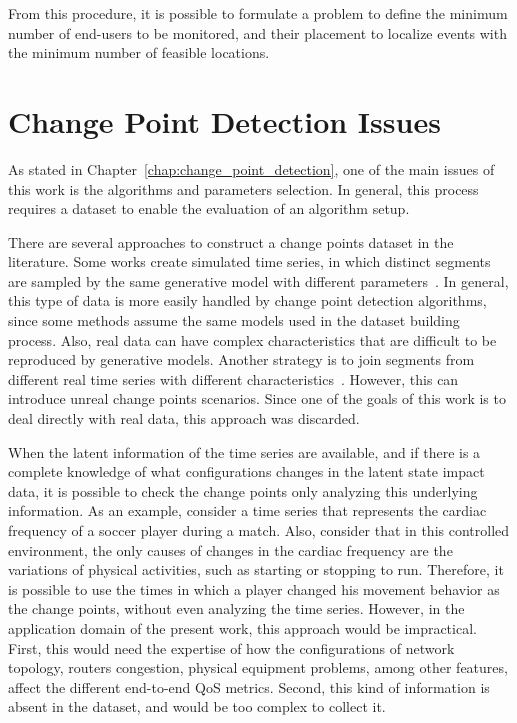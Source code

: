 From this procedure, it is possible to formulate a
problem to define the minimum number of end-users to be monitored, and their
placement to localize events with the minimum number of feasible locations.

\section{Change Point Detection Issues}

As stated in Chapter~\ref{chap:change_point_detection}, one of the main issues
of this work is the algorithms and parameters selection.
In general, this process requires a dataset to enable the evaluation of an
algorithm setup.

There are several approaches to construct a
change points dataset in the literature.
Some works create simulated time series, in which distinct segments are sampled
by the same generative model with different
parameters~\cite{change_point_detection_in_time_series_data_by_relative_density_ratio_estimation}.
In general, this type of data is more easily handled by change point detection
algorithms, since some methods assume the same models used in the dataset
building process. Also, real data can have complex characteristics that are
difficult to be reproduced by generative models. Another strategy is to join
segments from different real time series with different
characteristics~\cite{inertial_hidden_markov_models_modeling_change_in_multivariate_time_series}.
However, this can introduce unreal change points scenarios. Since one of
the goals of this work is to deal directly with real data,
this approach was discarded.

When the latent information of the time series are available, and if there is a
complete knowledge of what configurations changes in the latent state impact
data, it is possible to check the change points only analyzing this underlying
information. As an example, consider a time series that represents the cardiac
frequency of a soccer player during a match. Also, consider that in this
controlled environment, the only causes of changes in the cardiac frequency are
the variations of physical activities, such as starting or stopping to run.
Therefore,
it is possible to use the times in which a player changed his movement behavior
as the change points, without even analyzing the time series. However, in the
application domain of the present work, this approach would be impractical.
First, this would need the expertise of how the configurations of network
topology, routers congestion, physical equipment problems, among other features,
affect the different end-to-end QoS metrics.
Second, this kind of information is absent in the dataset, and would be too
complex to collect it.

